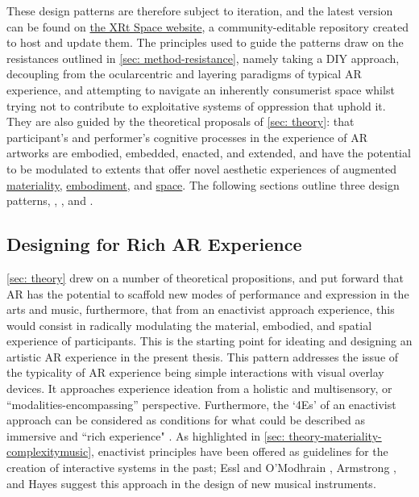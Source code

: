 These design patterns are therefore subject to iteration, and the latest version can be found on \href{https://www.thexrt.space}{the XRt Space website}, a community-editable repository created to host and update them. The principles used to guide the patterns draw on the resistances outlined in \autoref{sec: method-resistance}, namely taking a DIY approach, decoupling from the ocularcentric and layering paradigms of typical AR experience, and attempting to navigate an inherently consumerist space whilst trying not to contribute to exploitative systems of oppression that uphold it. They are also guided by the theoretical proposals of \autoref{sec: theory}: that participant's and performer's cognitive processes in the experience of AR artworks are embodied, embedded, enacted, and extended, and have the potential to be modulated to extents that offer novel aesthetic experiences of augmented \hyperref[sec: theory-materiality]{materiality}, \hyperref[sec: theory-embodiment]{embodiment}, and \hyperref[sec: theory-space]{space}. The following sections outline three design patterns, \textit{}, \textit{}, and \textit{}.

\subsection{Designing for Rich AR Experience} \label{sec: discussion-patterns-experience} 
\autoref{sec: theory} drew on a number of theoretical propositions, and put forward that AR has the potential to scaffold new modes of performance and expression in the arts and music, furthermore, that from an enactivist approach experience, this would consist in radically modulating the material, embodied, and spatial experience of participants. This is the starting point for ideating and designing an artistic AR experience in the present thesis. This pattern addresses the issue of the typicality of AR experience being simple interactions with visual overlay devices. It approaches experience ideation from a holistic and multisensory, or ``modalities-encompassing'' \citep{schraffenberger2018} perspective. Furthermore, the `4Es' of an enactivist approach can be considered as conditions for what could be described as immersive and ``rich experience" \citep{bilbow2021}. As highlighted in \autoref{sec: theory-materiality-complexitymusic}, enactivist principles have been offered as guidelines for the creation of interactive systems in the past; Essl and O'Modhrain \citeyearpar{essl2006}, Armstrong \citeyearpar{armstrong2006}, and Hayes \citeyearpar{hayes2019} suggest this approach in the design of new musical instruments. 

